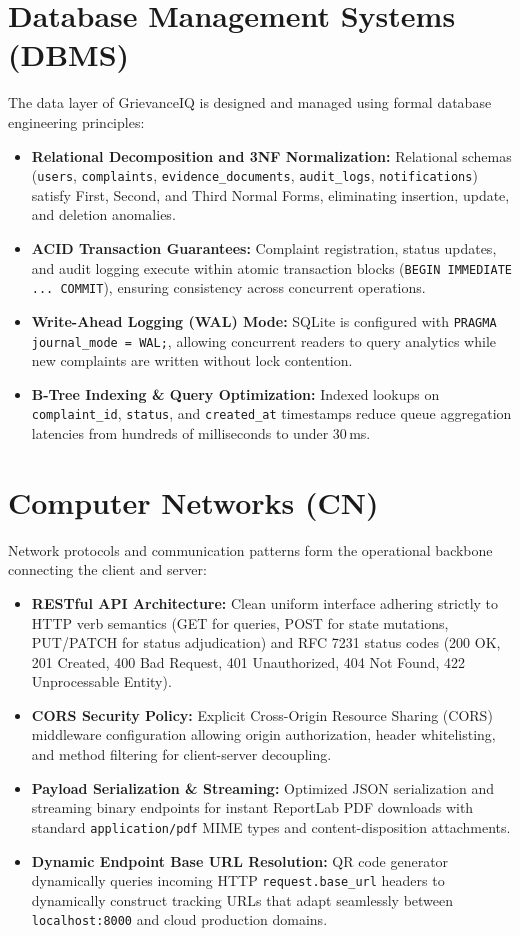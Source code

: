 \section{Database Management Systems (DBMS)}
The data layer of GrievanceIQ is designed and managed using formal database engineering principles:
\begin{itemize}
    \item \textbf{Relational Decomposition and 3NF Normalization:} Relational schemas (\texttt{users}, \texttt{complaints}, \texttt{evidence\_documents}, \texttt{audit\_logs}, \texttt{notifications}) satisfy First, Second, and Third Normal Forms, eliminating insertion, update, and deletion anomalies.
    \item \textbf{ACID Transaction Guarantees:} Complaint registration, status updates, and audit logging execute within atomic transaction blocks (\texttt{BEGIN IMMEDIATE ... COMMIT}), ensuring consistency across concurrent operations.
    \item \textbf{Write-Ahead Logging (WAL) Mode:} SQLite is configured with \texttt{PRAGMA journal\_mode = WAL;}, allowing concurrent readers to query analytics while new complaints are written without lock contention.
    \item \textbf{B-Tree Indexing \& Query Optimization:} Indexed lookups on \texttt{complaint\_id}, \texttt{status}, and \texttt{created\_at} timestamps reduce queue aggregation latencies from hundreds of milliseconds to under 30\,ms.
\end{itemize}

\section{Computer Networks (CN)}
Network protocols and communication patterns form the operational backbone connecting the client and server:
\begin{itemize}
    \item \textbf{RESTful API Architecture:} Clean uniform interface adhering strictly to HTTP verb semantics (GET for queries, POST for state mutations, PUT/PATCH for status adjudication) and RFC 7231 status codes (200 OK, 201 Created, 400 Bad Request, 401 Unauthorized, 404 Not Found, 422 Unprocessable Entity).
    \item \textbf{CORS Security Policy:} Explicit Cross-Origin Resource Sharing (CORS) middleware configuration allowing origin authorization, header whitelisting, and method filtering for client-server decoupling.
    \item \textbf{Payload Serialization \& Streaming:} Optimized JSON serialization and streaming binary endpoints for instant ReportLab PDF downloads with standard \texttt{application/pdf} MIME types and content-disposition attachments.
    \item \textbf{Dynamic Endpoint Base URL Resolution:} QR code generator dynamically queries incoming HTTP \texttt{request.base\_url} headers to dynamically construct tracking URLs that adapt seamlessly between \texttt{localhost:8000} and cloud production domains.
\end{itemize}


